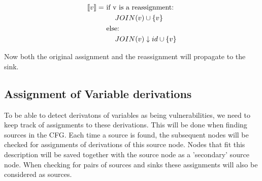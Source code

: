 \begin{align*}
  \llbracket v \rrbracket = &\text{ if v is a reassignment:}\\
  &\phantom{==}JOIN(v) \cup \{ v \}\\
  &\text{ else:}\\
  &\phantom{==}JOIN(v) \downarrow id \cup \{ v \}\\
\end{align*}

Now both the original assignment and the reassignment will propagate to the sink.

\subsection{Assignment of Variable derivations}\label{ext:derivation}
To be able to detect derivatons of variables as being vulnerabilities, we need to keep track of assignments to these derivations.
This will be done when finding sources in the CFG.
Each time a source is found, the subsequent nodes will be checked for assignments of derivations of this source node.
Nodes that fit this description will be saved together with the source node as a 'secondary' source node.
When checking for pairs of sources and sinks these assignments will also be considered as sources.
